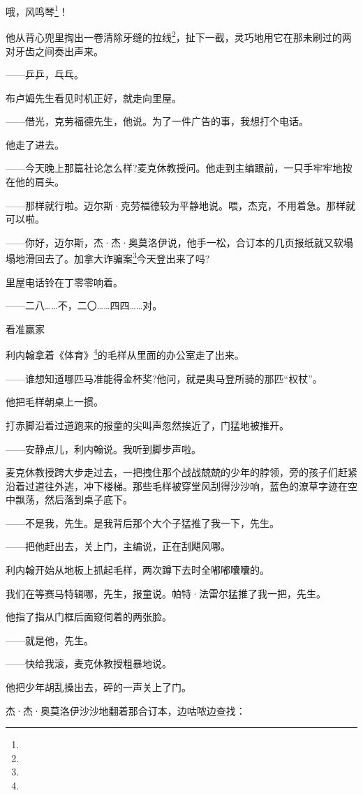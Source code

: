 \par 哦，风鸣琴\footnote{}！
\par 他从背心兜里掏出一卷清除牙缝的拉线\footnote{}，扯下一截，灵巧地用它在那未刷过的两对牙齿之间奏出声来。
\par ——乒乒，乓乓。
\par 布卢姆先生看见时机正好，就走向里屋。
\par ——借光，克劳福德先生，他说。为了一件广告的事，我想打个电话。
\par 他走了进去。
\par ——今天晚上那篇社论怎么样?麦克休教授问。他走到主编跟前，一只手牢牢地按在他的肩头。
\par ——那样就行啦。迈尔斯·克劳福德较为平静地说。喂，杰克，不用着急。那样就可以啦。
\par ——你好，迈尔斯，杰·杰·奥莫洛伊说，他手一松，合订本的几页报纸就又软塌塌地滑回去了。加拿大诈骗案\footnote{}今天登出来了吗?
\par 里屋电话铃在丁零零响着。
\par ——二八……不，二〇……四四……对。
\par 看准赢家
\par 利内翰拿着《体育》\footnote{}的毛样从里面的办公室走了出来。
\par ——谁想知道哪匹马准能得金杯奖?他问，就是奥马登所骑的那匹“权杖”。
\par 他把毛样朝桌上一掼。
\par 打赤脚沿着过道跑来的报童的尖叫声忽然挨近了，门猛地被推开。
\par ——安静点儿，利内翰说。我听到脚步声啦。
\par 麦克休教授跨大步走过去，一把拽住那个战战兢兢的少年的脖领，旁的孩子们赶紧沿着过道往外逃，冲下楼梯。那些毛样被穿堂风刮得沙沙响，蓝色的潦草字迹在空中飘荡，然后落到桌子底下。
\par ——不是我，先生。是我背后那个大个子猛推了我一下，先生。
\par ——把他赶出去，关上门，主编说，正在刮飓风哪。
\par 利内翰开始从地板上抓起毛样，两次蹲下去时全嘟嘟囔囔的。
\par 我们在等赛马特辑哪，先生，报童说。帕特·法雷尔猛推了我一把，先生。
\par 他指了指从门框后面窥伺着的两张脸。
\par ——就是他，先生。
\par ——快给我滚，麦克休教授粗暴地说。
\par 他把少年胡乱搡出去，砰的一声关上了门。
\par 杰·杰·奥莫洛伊沙沙地翻着那合订本，边咕哝边查找：
